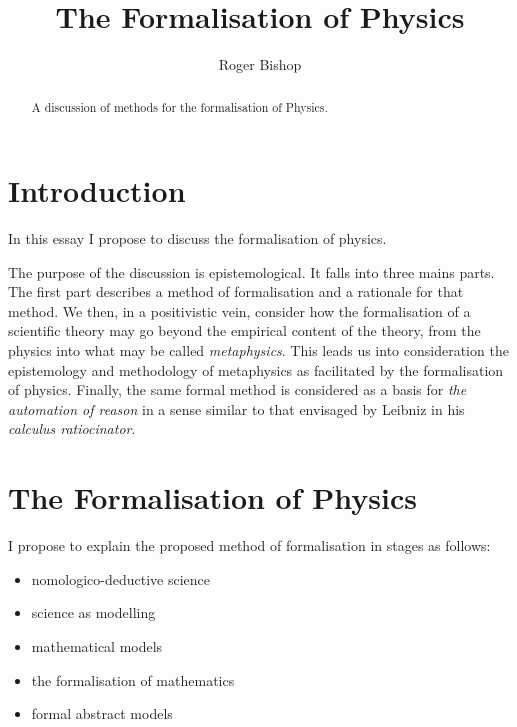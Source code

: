 \documentclass{rbjk}
\begin{document}
                                                                                   
\begin{article}
\begin{opening}  
\title{The Formalisation of Physics}
\author{Roger Bishop }

\begin{abstract}
A discussion of methods for the formalisation of Physics.
\end{abstract}
\end{opening}

\setcounter{tocdepth}{4}
{\parskip-0pt\tableofcontents}

\section{Introduction}

In this essay I propose to discuss the formalisation of physics.

The purpose of the discussion is epistemological.
It falls into three mains parts.
The first part describes a method of formalisation and a rationale for that method.
We then, in a positivistic vein, consider how the formalisation of a scientific theory may go beyond the empirical content of the theory, from the physics into what may be called {\it metaphysics}.
This leads us into consideration the epistemology and methodology of metaphysics as facilitated by the formalisation of physics.
Finally, the same formal method is considered as a basis for {\it the automation of reason} in a sense similar to that envisaged by Leibniz in his {\it calculus ratiocinator}.

\section{The Formalisation of Physics}

I propose to explain the proposed method of formalisation in stages as follows:

\begin{itemize}
\item nomologico-deductive science
\item science as modelling
\item mathematical models
\item the formalisation of mathematics
\item formal abstract models
\end{itemize}


\end{article}
\end{document}
